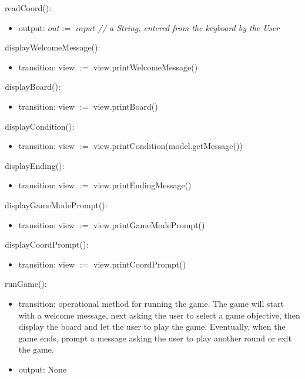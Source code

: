 \documentclass[12pt]{article}
\begin{document}
\noindent readCoord():
\begin{itemize}
  \item output: $out :=$ $input$ \textit{// a String, entered from the keyboard by the User} 
\end{itemize}

\noindent displayWelcomeMessage():
\begin{itemize}
  \item transition: view $:=$ view.printWelcomeMessage()
\end{itemize}

\noindent displayBoard():
\begin{itemize}
  \item transition: view $:=$ view.printBoard()
\end{itemize}

\noindent displayCondition():
\begin{itemize}
  \item transition: view $:=$ view.printCondition(model.getMessage())
\end{itemize}

\noindent displayEnding():
\begin{itemize}
  \item transition: view $:=$ view.printEndingMessage()
\end{itemize}

\noindent displayGameModePrompt():
\begin{itemize}
  \item transition: view $:=$ view.printGameModePrompt()
\end{itemize}

\noindent displayCoordPrompt():
\begin{itemize}
  \item transition: view $:=$ view.printCoordPrompt()
\end{itemize}

\noindent runGame():
\begin{itemize}
  \item transition: operational method for running the game. The game will start with a welcome message, next
                    asking the user to select a game objective, then display the board and let the user to play the game. 
                    Eventually, when the game ends, prompt a message asking the user to play another round or exit the game.
  \item output: None
\end{itemize}
\end{document}
